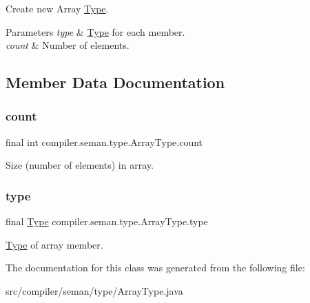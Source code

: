 Create new Array \hyperlink{classcompiler_1_1seman_1_1type_1_1_type}{Type}. 
\begin{DoxyParams}{Parameters}
{\em type} & \hyperlink{classcompiler_1_1seman_1_1type_1_1_type}{Type} for each member. \\
\hline
{\em count} & Number of elements. \\
\hline
\end{DoxyParams}


\subsection{Member Data Documentation}
\mbox{\label{classcompiler_1_1seman_1_1type_1_1_array_type_a97ed5b302dd6a2bf187b0b23397e75ce}} 
\subsubsection{\texorpdfstring{count}{count}}
{\footnotesize\ttfamily final int compiler.\+seman.\+type.\+Array\+Type.\+count}

Size (number of elements) in array. \mbox{\label{classcompiler_1_1seman_1_1type_1_1_array_type_a37210dd718bff85cdb5b2054beeb7c34}} 
\subsubsection{\texorpdfstring{type}{type}}
{\footnotesize\ttfamily final \hyperlink{classcompiler_1_1seman_1_1type_1_1_type}{Type} compiler.\+seman.\+type.\+Array\+Type.\+type}

\hyperlink{classcompiler_1_1seman_1_1type_1_1_type}{Type} of array member. 

The documentation for this class was generated from the following file\+:\begin{DoxyCompactItemize}
\item 
src/compiler/seman/type/Array\+Type.\+java\end{DoxyCompactItemize}
